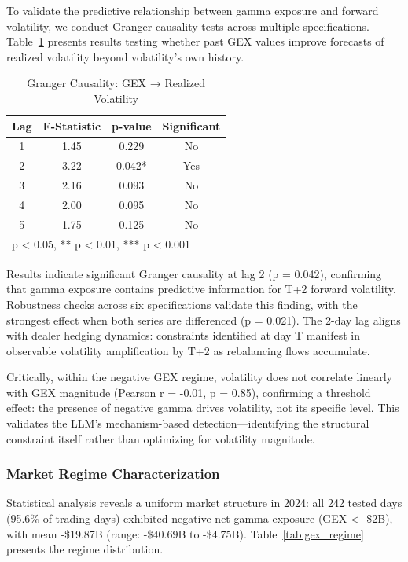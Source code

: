 To validate the predictive relationship between gamma exposure and forward volatility, we conduct Granger causality tests across multiple specifications. Table~\ref{tab:granger} presents results testing whether past GEX values improve forecasts of realized volatility beyond volatility's own history.

\begin{table}[htbp]
\centering
\caption{Granger Causality: GEX → Realized Volatility}
\label{tab:granger}
\begin{tabular}{cccc}
\toprule
Lag & F-Statistic & p-value & Significant \\
\midrule
1 & 1.45 & 0.229 & No \\
2 & 3.22 & 0.042* & Yes \\
3 & 2.16 & 0.093 & No \\
4 & 2.00 & 0.095 & No \\
5 & 1.75 & 0.125 & No \\
\bottomrule
\multicolumn{4}{l}{\footnotesize * p < 0.05, ** p < 0.01, *** p < 0.001}
\end{tabular}
\end{table}

Results indicate significant Granger causality at lag 2 (p = 0.042), confirming that gamma exposure contains predictive information for T+2 forward volatility. Robustness checks across six specifications validate this finding, with the strongest effect when both series are differenced (p = 0.021). The 2-day lag aligns with dealer hedging dynamics: constraints identified at day T manifest in observable volatility amplification by T+2 as rebalancing flows accumulate.

Critically, within the negative GEX regime, volatility does not correlate linearly with GEX magnitude (Pearson r = -0.01, p = 0.85), confirming a threshold effect: the presence of negative gamma drives volatility, not its specific level. This validates the LLM's mechanism-based detection—identifying the structural constraint itself rather than optimizing for volatility magnitude.

\subsubsection{Market Regime Characterization}

Statistical analysis reveals a uniform market structure in 2024: all 242 tested days (95.6\% of trading days) exhibited negative net gamma exposure (GEX < -\$2B), with mean -\$19.87B (range: -\$40.69B to -\$4.75B). Table~\ref{tab:gex_regime} presents the regime distribution.

